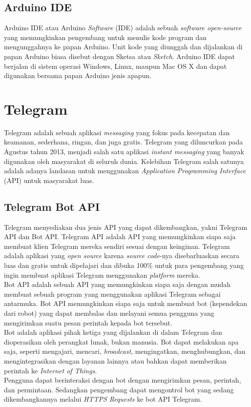 \subsection{Arduino IDE}
\tab Arduino IDE atau Arduino \textit{Software} (IDE) adalah sebuah \textit{software open-source} yang memungkinkan pengembang untuk menulis kode program dan mengunggahnya ke papan Arduino. Unit kode yang diunggah dan dijalankan di papan Arduino biasa disebut dengan Sketsa atau \textit{Sketch}. Arduino IDE dapat berjalan di sistem operasi Windows, Linux, maupun Mac OS X dan dapat digunakan bersama papan Arduino jenis apapun. 

\section{Telegram}
\tab Telegram adalah sebuah aplikasi \textit{messaging} yang fokus pada kecepatan dan keamanan, sederhana, ringan, dan juga gratis. Telegram yang diluncurkan pada Agustus tahun 2013, menjadi salah satu aplikasi \textit{instant messaging} yang banyak digunakan oleh masyarakat di seluruh dunia. Kelebihan Telegram salah satunya adalah adanya landasan untuk menggunakan \textit{Application Programming Interface} (API) untuk
masyarakat luas.

\subsection{Telegram Bot API}
\tab Telegram menyediakan dua jenis API yang dapat dikembangkan, yakni  Telegram API dan Bot API.\cite{telegram} Telegram API adalah API yang memungkinkan siapa saja membuat klien Telegram mereka sendiri sesuai dengan keinginan. Telegram adalah aplikasi yang \textit{open source} karena \textit{source code}-nya disebarluaskan secara luas dan gratis untuk dipelajari dan dibuka 100\% untuk para pengembang yang ingin membuat aplikasi Telegram menggunakan \textit{platform} mereka. \\
\tab Bot API adalah sebuah API yang memungkinkan siapa saja dengan mudah membuat sebuah program yang menggunakan aplikasi Telegram sebagai antarmuka.\cite{telegram-bot} Bot API memungkinkan siapa saja untuk membuat bot (kependekan dari robot) yang dapat membalas dan melayani semua pengguna yang mengirimkan suatu pesan perintah kepada bot tersebut. \\
\tab Bot adalah aplikasi pihak ketiga yang dijalankan di dalam Telegram dan dioperasikan oleh perangkat lunak, bukan manusia. Bot dapat melakukan apa saja, seperti mengajari, mencari, \textit{broadcast}, mengingatkan, menghubungkan, dan mengintegrasikan dengan layanan lainnya atau bahkan dapat memberikan perintah ke \textit{Internet of Things}.\\
\tab Pengguna dapat berinteraksi dengan bot dengan mengirimkan pesan, perintah, dan permintaan. Sedangkan pengembang dapat mengontrol bot yang sedang dikembangkannya melalui \textit{HTTPS Requests} ke bot API Telegram.

